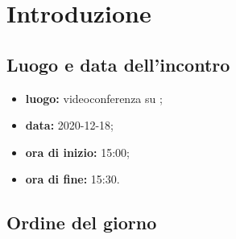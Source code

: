 \section*{Introduzione}
\subsection*{Luogo e data dell'incontro}
\begin{itemize}
	\item \textbf{luogo:} videoconferenza su ;
	\item \textbf{data:} 2020-12-18;
	\item \textbf{ora di inizio:} 15:00;
	\item \textbf{ora di fine:} 15:30.
\end{itemize}

\subsection*{Ordine del giorno}
